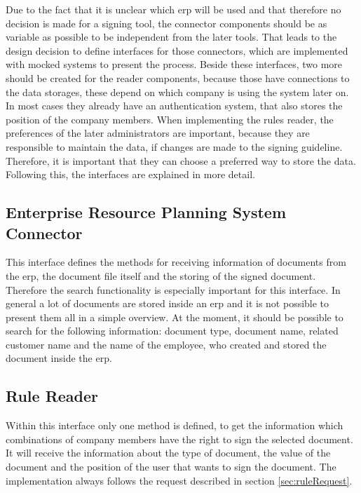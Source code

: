 Due to the fact that it is unclear which \gls{erp} will be used and that therefore no decision is made for a signing tool, the connector components should be as variable as possible to be independent from the later tools. That leads to the design decision to define interfaces for those connectors, which are implemented with mocked systems to present the process. \newline
Beside these interfaces, two more should be created for the reader components, because those have connections to the data storages, these depend on which company is using the system later on. In most cases they already have an authentication system, that also stores the position of the company members. When implementing the rules reader, the preferences of the later administrators are important, because they are responsible to maintain the data, if changes are made to the signing guideline. Therefore, it is important that they can choose a preferred way to store the data. Following this, the interfaces are explained in more detail.

\subsection*{Enterprise Resource Planning System Connector}
This interface defines the methods for receiving information of documents from the \gls{erp}, the document file itself and the storing of the signed document. Therefore the search functionality is especially important for this interface. In general a lot of documents are stored inside an \gls{erp} and it is not possible to present them all in a simple overview. At the moment, it should be possible to search for the following information: document type, document name, related customer name and the name of the employee, who created and stored the document inside the \gls{erp}.

\subsection*{Rule Reader}
Within this interface only one method is defined, to get the information which combinations of company members have the right to sign the selected document. It will receive the information about the type of document, the value of the document and the position of the user that wants to sign the document. The implementation always follows the request described in section \ref{sec:ruleRequest}.

